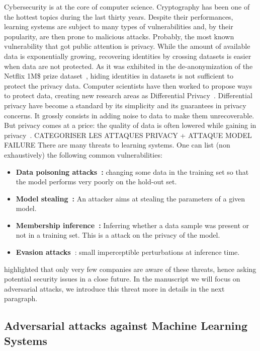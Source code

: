Cybersecurity is at the core of computer science. Cryptography has been one of the hottest topics during the last thirty years. Despite their performances, learning systems are subject to many types of vulnerabilities and, by their popularity, are then prone to malicious attacks. Probably, the most known vulnerability that got public attention is privacy. While the amount of available data is exponentially growing, recovering identities by crossing datasets is easier when data are not protected. As it was exhibited in the de-anonymization of the Netflix 1M\$ prize dataset~\citep{narayanan2008robust}, hiding identities in datasets is not sufficient to protect the privacy data. Computer scientists have then worked to propose ways to protect data, creating new research areas as Differential Privacy~\citep{dwork2008differential}. Differential privacy have become a standard by its simplicity and its guarantees in privacy concerns. It grossly consists in adding noise to data to make them unrecoverable. But privacy comes at a price: the quality of data is often lowered while gaining in privacy~\citep{XXX}. CATEGORISER LES ATTAQUES PRIVACY + ATTAQUE MODEL FAILURE
There are many threats to learning systems. One can list (non exhaustively) the following common vulnerabilities:
\begin{itemize}
    \item \textbf{Data poisoning attacks~\citep{kearns1993learning}:} changing some data in the training set so that the model performs very poorly on the hold-out set. 
    \item  \textbf{Model stealing~\citep{tramer2016stealing}:} An attacker aims at stealing the parameters of a given model.
    \item \textbf{Membership inference~\citep{shokri2017membership}:} Inferring whether a data sample was present or not in a training set. This is a attack on the privacy of the model.
    \item \textbf{Evasion attacks~\citep{biggio2013evasion,Szegedy2013IntriguingPO}}: small imperceptible perturbations at inference time.
\end{itemize}
    
\cite{kumar2020adversarial} highlighted that only very few companies are aware of these threats, hence asking potential security issues in a close future. In the manuscript we will focus on adversarial attacks, we introduce this threat more in details in the next paragraph.

\subsection{Adversarial attacks against Machine Learning Systems}

